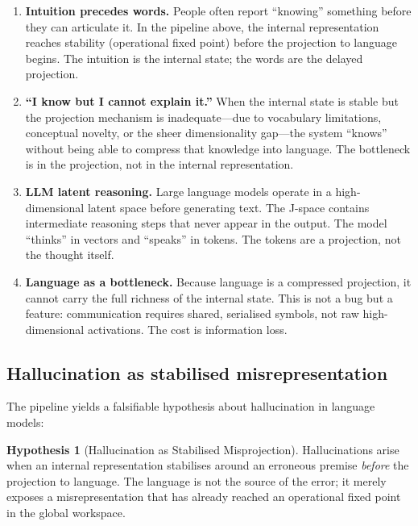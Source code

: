 \documentclass[11pt,a4paper]{article}
\theoremstyle{definition}
\newtheorem{hypothesis}{Hypothesis}
\begin{document}
\begin{enumerate}
    \item \textbf{Intuition precedes words.} People often report ``knowing''
    something before they can articulate it. In the pipeline above, the internal
    representation reaches stability (operational fixed point) before the
    projection to language begins. The intuition is the internal state; the words
    are the delayed projection.

    \item \textbf{``I know but I cannot explain it.''} When the internal state
    is stable but the projection mechanism is inadequate---due to vocabulary
    limitations, conceptual novelty, or the sheer dimensionality gap---the system
    ``knows'' without being able to compress that knowledge into language. The
    bottleneck is in the projection, not in the internal representation.

    \item \textbf{LLM latent reasoning.} Large language models operate in a
    high-dimensional latent space before generating text. The J-space contains
    intermediate reasoning steps that never appear in the output. The model
    ``thinks'' in vectors and ``speaks'' in tokens. The tokens are a projection,
    not the thought itself.

    \item \textbf{Language as a bottleneck.} Because language is a compressed
    projection, it cannot carry the full richness of the internal state. This is
    not a bug but a feature: communication requires shared, serialised symbols,
    not raw high-dimensional activations. The cost is information loss.
\end{enumerate}

\subsection{Hallucination as stabilised misrepresentation}

The pipeline yields a falsifiable hypothesis about hallucination in language
models:

\begin{hypothesis}[Hallucination as Stabilised Misprojection]
Hallucinations arise when an internal representation stabilises around an
erroneous premise \emph{before} the projection to language. The language is
not the source of the error; it merely exposes a misrepresentation that has
already reached an operational fixed point in the global workspace.
\end{hypothesis}
\end{document}
